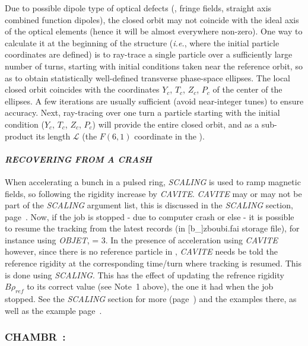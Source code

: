 \noindent Due to possible dipole type of optical defects (\eg, fringe fields, straight axis 
combined function dipoles), the closed orbit may not 
coincide with the ideal axis of the optical elements (hence it will be almost everywhere non-zero). One way to 
calculate it at the beginning of the structure (\emph{i.e.}, where the 
initial particle coordinates are defined) is to ray-trace 
a single particle over a sufficiently large number of turns, 
starting with   initial conditions  taken near the reference orbit, so as to 
obtain  statistically well-defined transverse phase-space ellipses. The 
local closed orbit  coincides with the 
coordinates $ Y_c $,  $ T_c $, $ Z_c $,  $ P_c $ of the center of the ellipses. 
A few iterations are usually sufficient (avoid near-integer tunes) to ensure accuracy.  Next, 
ray-tracing over one turn a particle starting with the initial condition 
($Y_c $, $ T_c $, $ Z_c$, $P_c$)  will provide the entire closed orbit, and as a sub-product its   length $\mathcal{L}$ 
(the $ F(6,1) $ coordinate in the \FORTRAN). 


\paragraph{\textit{RECOVERING FROM A CRASH}} \label{CrashCAVITE}

\noindent When accelerating a bunch in a pulsed ring, \textsl{SCALING} is used to ramp magnetic fields, 
so following the rigidity increase by  \textsl{CAVITE}.  \textsl{CAVITE} may or may not be part of the \textsl{SCALING}
argument list, this is discussed in the \textsl{SCALING} section, page~\pageref{CrashSCALING}. 
Now, if the job is stopped - due to computer crash or else -  it is possible to resume the tracking 
from the latest records (in [b\_]zboubi.fai storage file), for instance using \textsl{OBJET}, \KOBJ = 3.
In the presence of acceleration using \textsl{CAVITE} however,  since there is no reference particle in \zgou, 
  \textsl{CAVITE}  needs be told the reference rigidity at the corresponding time/turn where tracking is resumed. 
This is done using \textsl{SCALING}. This has the effect of updating 
the refrence rigidity $B\rho_{ref}$ to its correct value (see Note~1 above), the one it had when the job stopped. 
See  the \textsl{SCALING} section for more (page~\pageref{SCALING}) and the examples there, as well as the example 
 page~\pageref{ExaOBJ3Recovery}. 


\newpage

\subsubsection*{CHAMBR~:  \CHAMBRTitl}\label{CHAMBR} 
\medskip

